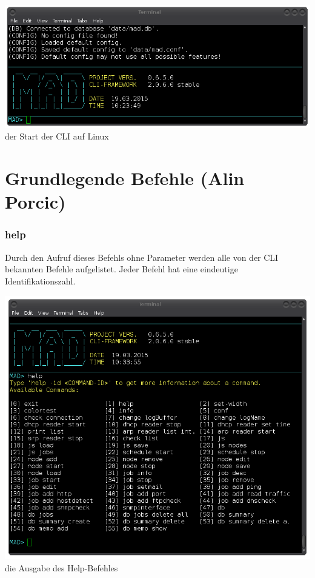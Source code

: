 \documentclass[12pt,a4paper]{report}
\begin{document}
\begin{onehalfspace}
\begin{center}
\includegraphics[scale=0.5]{img/cli_mad.png}\\
der Start der CLI auf Linux
\end{center}

\section{Grundlegende Befehle (Alin Porcic)}

\subsubsection{help}

Durch den Aufruf dieses Befehls ohne Parameter werden alle von der CLI bekannten Befehle aufgelistet. Jeder Befehl hat eine eindeutige Identifikationszahl.\\

\begin{center}
\includegraphics[scale=0.5]{img/cli_help.png}\\
die Ausgabe des Help-Befehles
\end{center}


\end{onehalfspace}
\end{document}
